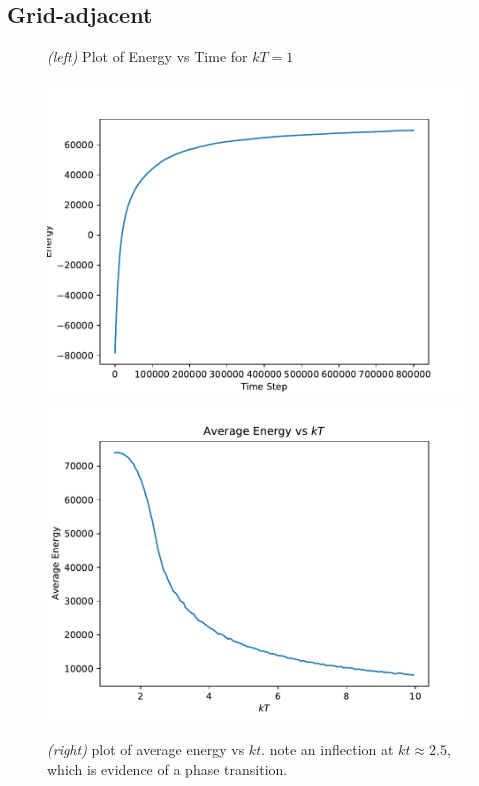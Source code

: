 \documentclass{article}
\begin{document}
\subsection*{Grid-adjacent}
\begin{figure}[H]
  \caption{\textit{(left)} Plot of Energy vs Time for $kT = 1$}
  \includegraphics[scale=0.4]{g_e_0.pdf}
  \includegraphics[scale=0.4]{g_avg_energy.pdf}
  \caption{\textit{(right)} plot of average energy vs $kt$.
    note an inflection at  $kt \approx 2.5$, which is evidence of a
    phase transition.}
\end{figure}
\end{document}
